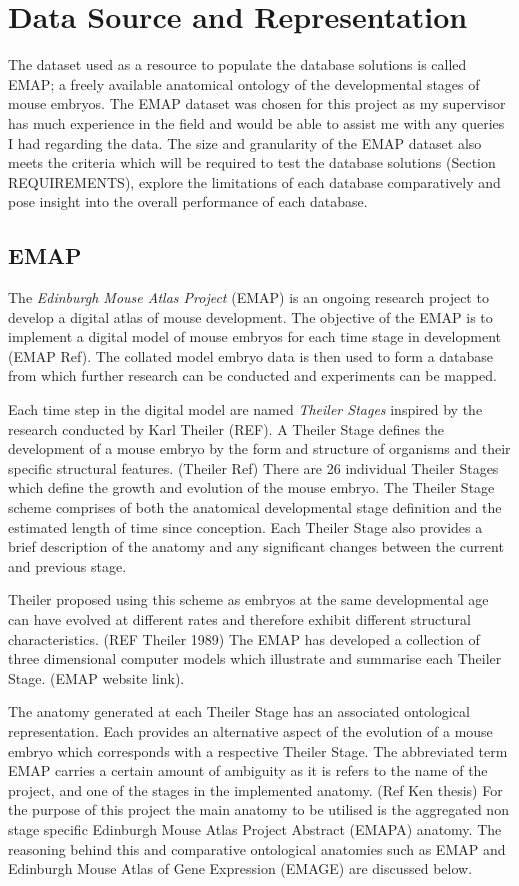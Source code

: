 \chapter{Data Source and Representation}
The dataset used as a resource to populate the database solutions is called EMAP; a freely available anatomical ontology of the developmental stages of mouse embryos. The EMAP dataset was chosen for this project as my supervisor has much experience in the field and would be able to assist me with any queries I had regarding the data. The size and granularity of the EMAP dataset also meets the criteria which will be required to test the database solutions (Section REQUIREMENTS), explore the limitations of each database comparatively and pose insight into the overall performance of each database.

\section{EMAP}
The \textit{Edinburgh Mouse Atlas Project} (EMAP) is an ongoing research project to develop a digital atlas of mouse development. The objective of the EMAP is to implement a digital model of mouse embryos for each time stage in development (EMAP Ref). The collated model embryo data is then used to form a database from which further research can be conducted and experiments can be mapped.
 
Each time step in the digital model are named \textit{Theiler Stages} inspired by the research conducted by Karl Theiler (REF). A Theiler Stage defines the development of a mouse embryo by the form and structure of organisms and their specific structural features. (Theiler Ref) There are 26 individual Theiler Stages which define the growth and evolution of the mouse embryo. The Theiler Stage scheme comprises of both the anatomical developmental stage definition and the estimated length of time since conception. Each Theiler Stage also provides a brief description of the anatomy and any significant changes between the current and previous stage.

Theiler proposed using this scheme as embryos at the same developmental age can have evolved at different rates and therefore exhibit different structural characteristics. (REF Theiler 1989) The EMAP has developed a collection of three dimensional computer models which illustrate and summarise each Theiler Stage. (EMAP website link). 

The anatomy generated at each Theiler Stage has an associated ontological representation. Each provides an alternative aspect of the evolution of a mouse embryo which corresponds with a respective Theiler Stage. The abbreviated term EMAP carries a certain amount of ambiguity as it is refers to the name of the project, and one of the stages in the implemented anatomy. (Ref Ken thesis)  For the purpose of this project the main anatomy to be utilised is the aggregated non stage specific Edinburgh Mouse Atlas Project Abstract (EMAPA) anatomy. The reasoning behind this and comparative ontological anatomies such as EMAP and Edinburgh Mouse Atlas of Gene Expression (EMAGE) are discussed below.

